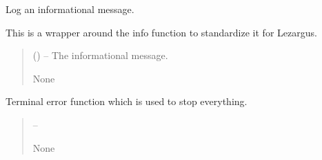 \documentclass[letterpaper,11pt,english]{sphinxmanual}
\begin{document}

\begin{savenotes}\begin{fulllineitems}
\label{\detokenize{code/lezargus.library.logging:lezargus.library.logging.info}}
\pysigstartsignatures
{}
\pysigstopsignatures
\sphinxAtStartPar
Log an informational message.

\sphinxAtStartPar
This is a wrapper around the info function to standardize it for Lezargus.
\begin{quote}\begin{description}
\sphinxAtStartPar
{} () – The informational message.

\sphinxAtStartPar
None

\end{description}\end{quote}

\end{fulllineitems}\end{savenotes}


\begin{savenotes}\begin{fulllineitems}
\label{\detokenize{code/lezargus.library.logging:lezargus.library.logging.terminal}}
\pysigstartsignatures
{}
\pysigstopsignatures
\sphinxAtStartPar
Terminal error function which is used to stop everything.
\begin{quote}\begin{description}
\sphinxAtStartPar
{} – 

\sphinxAtStartPar
None

\end{description}\end{quote}

\end{fulllineitems}\end{savenotes}
\end{document}
